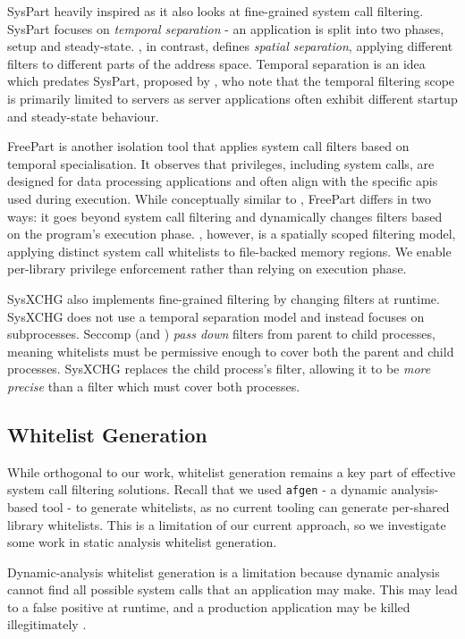 SysPart \cite{SYSPART} heavily inspired \af as it also
looks at fine-grained system call filtering. SysPart focuses on \textit{temporal
separation} - an application is split into two phases, setup and steady-state.
\af, in contrast, defines \textit {spatial separation}, applying different
filters to different parts of the address space. Temporal separation is an
idea which predates SysPart, proposed by \textcite{TEMPORAL_SPEC}, who note that
the temporal filtering scope is primarily limited to servers as server
applications often exhibit different startup and steady-state behaviour. 

FreePart \cite{ahad2023freepart} is another isolation tool that applies
system call filters based on temporal specialisation. It observes that privileges, including system calls, are designed for data processing applications
and often align with the specific \acp{api} used during execution. While
conceptually similar to \af, FreePart differs in two ways: it goes
beyond system call filtering and dynamically changes filters based on
the program's execution phase. \af, however, is a spatially scoped filtering
model, applying distinct system call whitelists to file-backed memory regions.
We enable per-library privilege enforcement rather than relying on execution 
phase.

SysXCHG \cite{SYSXCHG} also implements fine-grained filtering by changing
filters at runtime. SysXCHG does not use a temporal separation model and instead
focuses on subprocesses. Seccomp (and \af) \textit{pass down} filters from
parent to child processes, meaning whitelists must be permissive enough
to cover both the parent and child processes. SysXCHG replaces the child
process's filter, allowing it to be \textit{more precise} than a filter which
must cover both processes.

\subsection{Whitelist Generation}

While orthogonal to our work, whitelist generation remains a key part of
effective system call filtering solutions. Recall that we used \texttt{afgen} -
a dynamic analysis-based tool - to generate \af whitelists, as no current
tooling can generate per-shared library whitelists. This is a limitation
of our current approach, so we investigate some work in static analysis
whitelist generation.

Dynamic-analysis whitelist generation is a limitation because dynamic analysis
cannot find all possible system calls that an application may
make. This may lead to a false positive at runtime, and a production application
may be killed illegitimately \cite{XING2022105}. 

